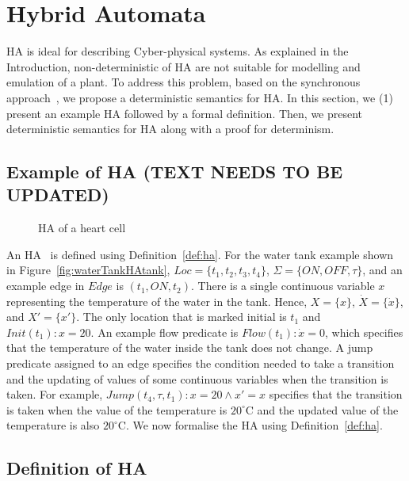 \section{Hybrid Automata}
\label{sec:HA}



\acf{HA} is ideal for describing 
Cyber-physical systems. As explained in the Introduction,
non-deterministic of \ac{HA} are not suitable for modelling and
emulation of a plant. To address this problem, based on the
synchronous approach~\cite{benveniste03}, we propose a deterministic semantics for \ac{HA}.
In this section, we (1) present an example \ac{HA} 
followed by a formal definition.
Then, we present deterministic semantics for \ac{HA} 
along with a proof for determinism.



\subsection{Example of \ac{HA} (TEXT NEEDS TO BE UPDATED)}

\begin{figure}
\centering

\caption{\acf{HA} of a heart cell}
\label{fig:cellHA}
\end{figure}

An HA~\cite{lynch03} is defined using Definition~\ref{def:ha}. For the
water tank example shown in Figure~\ref{fig:waterTankHAtank},
$Loc=\{t_1, t_2, t_3, t_4\}$, $\Sigma=\{ON, OFF, \tau\}$, and an example
edge in $Edge$ is $(t_1, ON, t_2)$. There is a single continuous
variable $x$ representing the temperature of the water in the
tank. Hence, $X=\{x\}$, $\dot{X}=\{\dot{x}\}$, and $X'=\{x'\}$. The only
location that is marked initial is $t_1$ and $Init(t_1): x=20$. An
example flow predicate is $Flow(t_1): \dot{x}=0$, which specifies that
the temperature of the water inside the tank does not change.  A jump
predicate assigned to an edge specifies the condition needed to take a
transition and the updating of values of some continuous variables when
the transition is taken.  For example,
$Jump(t_4, \tau, t_1): x=20 \wedge x'=x$ specifies that the transition
is taken when the value of the temperature is $20^\circ$C and the
updated value of the temperature is also $20^\circ$C. We now formalise
the HA using Definition~\ref{def:ha}.

\subsection{Definition of \ac{HA}}

